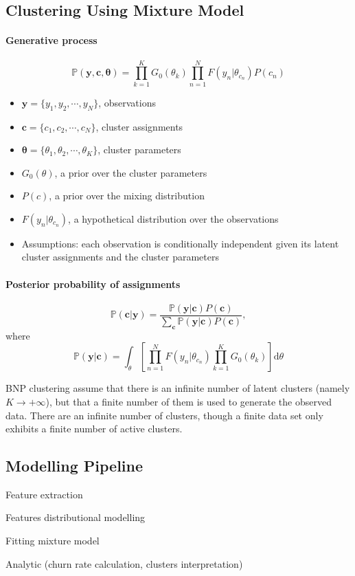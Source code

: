 \subsection{Clustering Using Mixture Model}

\paragraph{Generative process}

\begin{equation}
\mathbb{P} (\mathbf{y}, \mathbf{c}, \bm \theta) = \prod_{k=1}^K G_0 (\theta_k) \prod_{n=1}^N F(y_n | \theta_{c_n}) P(c_n)
\end{equation}

\begin{itemize}
\item $\mathbf{y} = \{y_1, y_2, \cdots, y_N \}$, observations
\item $\mathbf{c} = \{c_1, c_2, \cdots, c_N \}$, cluster assignments
\item $\bm \theta = \{\theta_1, \theta_2, \cdots, \theta_K \}$, cluster parameters
\item $G_0(\theta)$, a prior over the cluster parameters
\item $P(c)$, a prior over the mixing distribution
\item $F(y_n|\theta_{c_n})$, a hypothetical distribution over the observations
\item Assumptions: each observation is conditionally independent given its latent cluster assignments and the cluster parameters
\end{itemize}

\paragraph{Posterior probability of assignments}

\begin{equation}
\mathbb{P} (\mathbf{c} | \mathbf{y}) = \frac{\mathbb{P}(\mathbf{y} | \mathbf{c}) P(\mathbf{c})}{\sum_{\mathbf{c}} \mathbb{P}(\mathbf{y} | \mathbf{c}) P(\mathbf{c})},
\end{equation}
where
\begin{equation}
\mathbb{P}(\mathbf{y} | \mathbf{c}) = \int_\theta \left[ \prod_{n=1}^N F(y_n | \theta_{c_n}) \prod_{k=1}^K G_0 (\theta_k) \right] \text{d} \theta
\end{equation}


BNP clustering assume that there is an infinite number of latent clusters (namely $K \rightarrow +\infty$), but that a finite number of them is used to generate the observed data. There are an infinite number of clusters, though a finite data set only exhibits a finite number of active clusters.

\subsection{Modelling Pipeline}

Feature extraction

Features distributional modelling

Fitting mixture model

Analytic (churn rate calculation, clusters interpretation)
